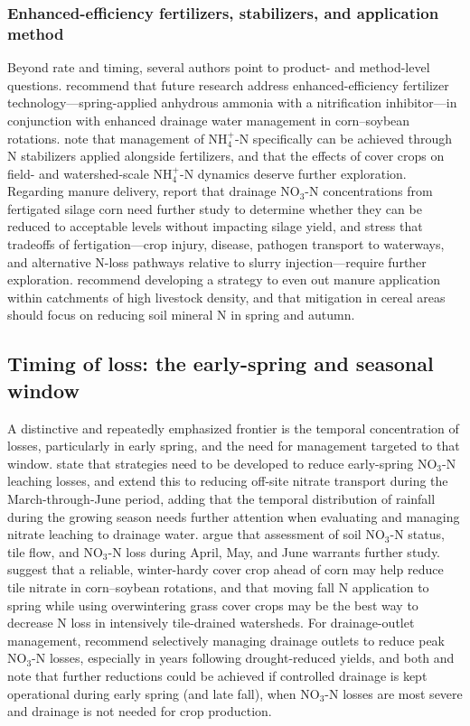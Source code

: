 \documentclass[11pt]{article}
\begin{document}
\subsubsection{Enhanced-efficiency fertilizers, stabilizers, and application method}
Beyond rate and timing, several authors point to product- and method-level questions. \textcite{Kaur2024c} recommend that future research address enhanced-efficiency fertilizer technology---spring-applied anhydrous ammonia with a nitrification inhibitor---in conjunction with enhanced drainage water management in corn--soybean rotations. \textcite{Vincent2025} note that management of NH$_4^+$-N specifically can be achieved through N stabilizers applied alongside fertilizers, and that the effects of cover crops on field- and watershed-scale NH$_4^+$-N dynamics deserve further exploration. Regarding manure delivery, \textcite{Gamble2018} report that drainage NO$_3$-N concentrations from fertigated silage corn need further study to determine whether they can be reduced to acceptable levels without impacting silage yield, and stress that tradeoffs of fertigation---crop injury, disease, pathogen transport to waterways, and alternative N-loss pathways relative to slurry injection---require further exploration. \textcite{Bechmann2014} recommend developing a strategy to even out manure application within catchments of high livestock density, and that mitigation in cereal areas should focus on reducing soil mineral N in spring and autumn.

\subsection{Timing of loss: the early-spring and seasonal window}
A distinctive and repeatedly emphasized frontier is the temporal concentration of losses, particularly in early spring, and the need for management targeted to that window. \textcite{Bakhsh2007} state that strategies need to be developed to reduce early-spring NO$_3$-N leaching losses, and \textcite{Bakhsh2010} extend this to reducing off-site nitrate transport during the March-through-June period, adding that the temporal distribution of rainfall during the growing season needs further attention when evaluating and managing nitrate leaching to drainage water. \textcite{Nance2007} argue that assessment of soil NO$_3$-N status, tile flow, and NO$_3$-N loss during April, May, and June warrants further study. \textcite{Gentry2024} suggest that a reliable, winter-hardy cover crop ahead of corn may help reduce tile nitrate in corn--soybean rotations, and that moving fall N application to spring while using overwintering grass cover crops may be the best way to decrease N loss in intensively tile-drained watersheds. For drainage-outlet management, \textcite{Skaggs1995} recommend selectively managing drainage outlets to reduce peak NO$_3$-N losses, especially in years following drought-reduced yields, and both \textcite{Elmi2004} and \textcite{Elmi2002} note that further reductions could be achieved if controlled drainage is kept operational during early spring (and late fall), when NO$_3$-N losses are most severe and drainage is not needed for crop production.
\end{document}
